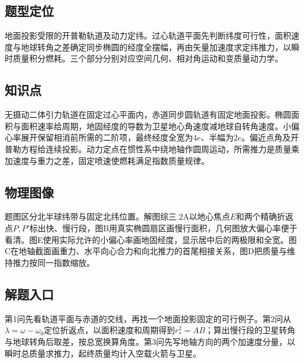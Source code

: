 \documentclass[UTF8,fontset=fandol,a4paper,11pt]{ctexart}
\begin{document}


\subsection*{题型定位}

地面投影受限的开普勒轨道及动力定纬。过心轨道平面先判断纬度可行性，面积速度与地球转角之差确定同步椭圆的经度全摆幅，再由矢量加速度求定纬推力，以瞬时质量积分燃耗。三个部分分别对应空间几何、相对角运动和变质量动力学。



\subsection*{知识点}

无摄动二体引力轨道在固定过心平面内，赤道同步圆轨道有固定地面投影。椭圆面积与面积速率给周期，地固经度的导数为卫星地心角速度减地球自转角速度。小偏心率展开保留相消前所需的二阶项，最终经度全宽为$4e$、半幅为$2e$。偏近点角及开普勒方程给连续投影。动力定点在惯性系中绕地轴作圆周运动，所需推力是质量乘加速度与重力之差，固定喷速使燃耗满足指数质量规律。



\subsection*{物理图像}

题图区分北半球纬带与固定北纬位置。解图综三.2A以地心焦点$E$和两个精确折返点$P,P'$标出快、慢行段，图B用真实椭圆扇区画慢行面积，几何图放大偏心率便于看清。图E使用实际允许的小偏心率画地固经度，显示居中后的两极限和全宽。图C在地轴截面画重力、水平向心合力和向北推力的首尾相接关系，图D把质量与维持推力按同一指数缩放。



\subsection*{解题入口}

第1问先看轨道平面与赤道的交线，再找一个地面投影固定的可行例子。第2问从$\dot\lambda=\omega-\omega_0$定位折返点，以面积速度和周期得到$r_*^2=AB$；算出慢行段的卫星转角与地球转角后取差，按总宽换算角度。第3问先写地轴方向的两个加速度分量，以瞬时总质量求推力，起终质量均计入空载火箭与卫星。
\end{document}
